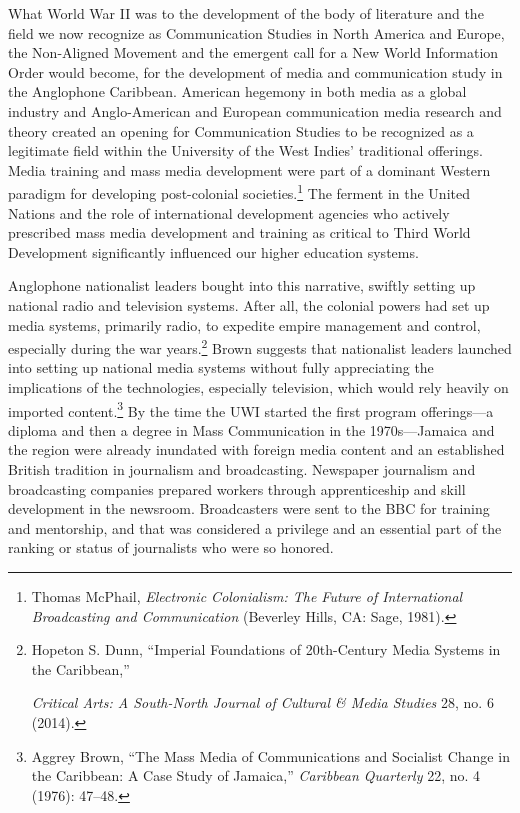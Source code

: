 \documentclass{tufte-handout}
\begin{document}
What World War II was to the development of the body of literature and
the field we now recognize as Communication Studies in North America and
Europe, the Non-Aligned Movement and the emergent call for a New World
Information Order would become, for the development of media and
communication study in the Anglophone Caribbean. American hegemony in
both media as a global industry and Anglo-American and European
communication media research and theory created an opening for
Communication Studies to be recognized as a legitimate field within the
University of the West Indies' traditional offerings. Media training and
mass media development were part of a dominant Western paradigm for
developing post-colonial societies.\footnote{Thomas McPhail,
  \emph{Electronic Colonialism: The Future of International Broadcasting
  and Communication} (Beverley Hills, CA: Sage, 1981).} The ferment in
the United Nations and the role of international development agencies
who actively prescribed mass media development and training as critical
to Third World Development significantly influenced our higher education
systems.

Anglophone nationalist leaders bought into this narrative, swiftly
setting up national radio and television systems. After all, the
colonial powers had set up media systems, primarily radio, to expedite
empire management and control, especially during the war
years.\footnote{Hopeton S. Dunn, ``Imperial Foundations of 20th-Century
  Media Systems in the Caribbean,''

  \emph{Critical Arts: A South-North Journal of Cultural \& Media
  Studies} 28, no. 6 (2014).} Brown suggests that nationalist leaders
launched into setting up national media systems without fully
appreciating the implications of the technologies, especially
television, which would rely heavily on imported content.\footnote{Aggrey
  Brown, ``The Mass Media of Communications and Socialist Change in the
  Caribbean: A Case Study of Jamaica,'' \emph{Caribbean Quarterly} 22,
  no. 4 (1976): 47--48.} By the time the UWI started the first program
offerings---a diploma and then a degree in Mass Communication in the
1970s---Jamaica and the region were already inundated with foreign media
content and an established British tradition in journalism and
broadcasting. Newspaper journalism and broadcasting companies prepared
workers through apprenticeship and skill development in the newsroom.
Broadcasters were sent to the BBC for training and mentorship, and that
was considered a privilege and an essential part of the ranking or
status of journalists who were so honored.
\end{document}
